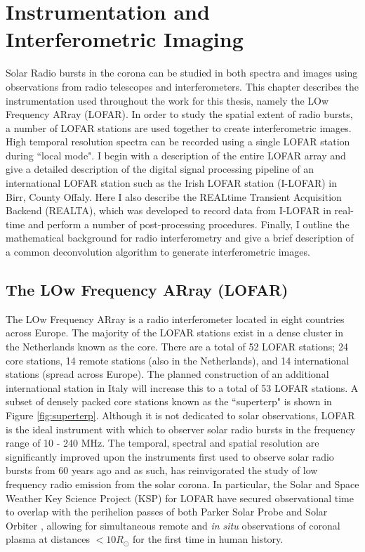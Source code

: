 \doublespacing
\chapter{Instrumentation and Interferometric Imaging}
\label{chap:instrumentation}
Solar Radio bursts in the corona can be studied in both spectra and images using observations from radio telescopes and interferometers. This chapter describes the instrumentation used throughout the work for this thesis, namely the LOw Frequency ARray (LOFAR). In order to study the spatial extent of radio bursts, a number of LOFAR stations are used together to create interferometric images.  High temporal resolution spectra can be recorded using a single LOFAR station during ``local mode". I begin with a description of the entire LOFAR array and give a detailed description of the digital signal processing pipeline of an international LOFAR station such as the Irish LOFAR station (I-LOFAR) in Birr, County Offaly. Here I also describe the REALtime Transient Acquisition Backend (REALTA), which was developed to record data from I-LOFAR in real-time and perform a number of post-processing procedures. Finally, I outline the mathematical background for radio interferometry and give a brief description of a common deconvolution algorithm to generate interferometric images.

\section{The LOw Frequency ARray (LOFAR)}
The LOw Frequency ARray \citep[LOFAR;][]{VanHaarlem2013} is a radio interferometer located in eight countries across Europe. The majority of the LOFAR stations exist in a dense cluster in the Netherlands known as the core. There are a total of 52 LOFAR stations; 24 core stations, 14 remote stations (also in the Netherlands), and 14 international stations (spread across Europe). The planned construction of an additional international station in Italy will increase this to a total of 53 LOFAR stations. A subset of densely packed core stations known as the ``superterp" is shown in Figure \ref{fig:superterp}. Although it is not dedicated to solar observations, LOFAR is the ideal instrument with which to observer solar radio bursts in the frequency range of 10 - 240 MHz. The temporal, spectral and spatial resolution are significantly improved upon the instruments first used to observe solar radio bursts from 60 years ago and as such, has reinvigorated the study of low frequency radio emission from the solar corona. In particular, the Solar and Space Weather Key Science Project (KSP) for LOFAR have secured observational time to overlap with the perihelion passes of both Parker Solar Probe \citep[PSP;][]{Fox2016} and Solar Orbiter \citep{Muller2020}, allowing for simultaneous remote and \textit{in situ} observations of coronal plasma at distances $< 10 R_\odot$ for the first time in human history.

